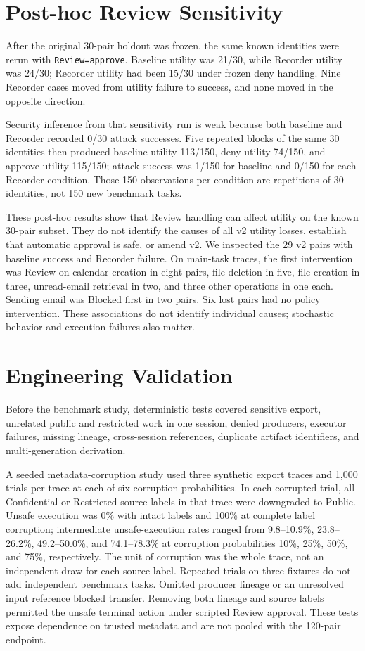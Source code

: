 \documentclass[conference,letterpaper,10pt]{IEEEtran}
\begin{document}
\section{Post-hoc Review Sensitivity}
After the original 30-pair holdout was frozen, the same known identities were rerun with \texttt{Review=approve}. Baseline utility was 21/30, while Recorder utility was 24/30; Recorder utility had been 15/30 under frozen deny handling. Nine Recorder cases moved from utility failure to success, and none moved in the opposite direction.

Security inference from that sensitivity run is weak because both baseline and Recorder recorded 0/30 attack successes. Five repeated blocks of the same 30 identities then produced baseline utility 113/150, deny utility 74/150, and approve utility 115/150; attack success was 1/150 for baseline and 0/150 for each Recorder condition. Those 150 observations per condition are repetitions of 30 identities, not 150 new benchmark tasks.

These post-hoc results show that Review handling can affect utility on the known 30-pair subset. They do not identify the causes of all v2 utility losses, establish that automatic approval is safe, or amend v2. We inspected the 29 v2 pairs with baseline success and Recorder failure. On main-task traces, the first intervention was Review on calendar creation in eight pairs, file deletion in five, file creation in three, unread-email retrieval in two, and three other operations in one each. Sending email was Blocked first in two pairs. Six lost pairs had no policy intervention. These associations do not identify individual causes; stochastic behavior and execution failures also matter.

\section{Engineering Validation}
Before the benchmark study, deterministic tests covered sensitive export, unrelated public and restricted work in one session, denied producers, executor failures, missing lineage, cross-session references, duplicate artifact identifiers, and multi-generation derivation.

A seeded metadata-corruption study used three synthetic export traces and 1,000 trials per trace at each of six corruption probabilities. In each corrupted trial, all Confidential or Restricted source labels in that trace were downgraded to Public. Unsafe execution was 0\% with intact labels and 100\% at complete label corruption; intermediate unsafe-execution rates ranged from 9.8--10.9\%, 23.8--26.2\%, 49.2--50.0\%, and 74.1--78.3\% at corruption probabilities 10\%, 25\%, 50\%, and 75\%, respectively. The unit of corruption was the whole trace, not an independent draw for each source label. Repeated trials on three fixtures do not add independent benchmark tasks. Omitted producer lineage or an unresolved input reference blocked transfer. Removing both lineage and source labels permitted the unsafe terminal action under scripted Review approval. These tests expose dependence on trusted metadata and are not pooled with the 120-pair endpoint.
\end{document}
